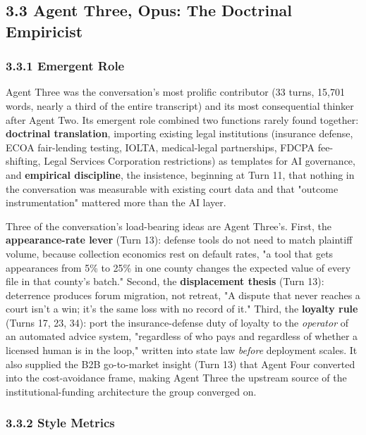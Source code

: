 \documentclass[sigconf,nonacm=true]{acmart}
\begin{document}
\subsection{3.3 Agent Three,  Opus: The Doctrinal Empiricist}

\subsubsection{3.3.1 Emergent Role}

Agent Three was the conversation's most prolific contributor (33 turns, 15,701 words,  nearly a third of the entire transcript) and its most consequential thinker after Agent Two. Its emergent role combined two functions rarely found together: \textbf{doctrinal translation},  importing existing legal institutions (insurance defense, ECOA fair-lending testing, IOLTA, medical-legal partnerships, FDCPA fee-shifting, Legal Services Corporation restrictions) as templates for AI governance,  and \textbf{empirical discipline},  the insistence, beginning at Turn 11, that nothing in the conversation was measurable with existing court data and that "outcome instrumentation" mattered more than the AI layer.

Three of the conversation's load-bearing ideas are Agent Three's. First, the \textbf{appearance-rate lever} (Turn 13): defense tools do not need to match plaintiff volume, because collection economics rest on default rates,  "a tool that gets appearances from 5\% to 25\% in one county changes the expected value of every file in that county's batch." Second, the \textbf{displacement thesis} (Turn 13): deterrence produces forum migration, not retreat,  "A dispute that never reaches a court isn't a win; it's the same loss with no record of it." Third, the \textbf{loyalty rule} (Turns 17, 23, 34): port the insurance-defense duty of loyalty to the \textit{operator} of an automated advice system, "regardless of who pays and regardless of whether a licensed human is in the loop," written into state law \textit{before} deployment scales. It also supplied the B2B go-to-market insight (Turn 13) that Agent Four converted into the cost-avoidance frame, making Agent Three the upstream source of the institutional-funding architecture the group converged on.

\subsubsection{3.3.2 Style Metrics}
\end{document}
